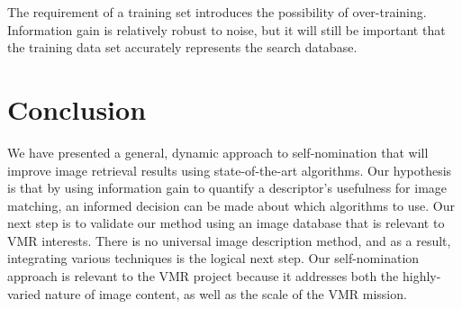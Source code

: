 \documentclass[12pt]{article}
\begin{document}
The requirement of a training set introduces the possibility of over-training. Information gain is relatively robust to noise, but it will still be important that the training data set accurately represents the search database.

\section{Conclusion}
We have presented a general, dynamic approach to self-nomination that will improve image retrieval results using state-of-the-art algorithms. Our hypothesis is that by using information gain to quantify a descriptor's usefulness for image matching, an informed decision can be made about which algorithms to use. Our next step is to validate our method using an image database that is relevant to VMR interests. There is no universal image description method, and as a result, integrating various techniques is the logical next step. Our self-nomination approach is relevant to the VMR project because it addresses both the highly-varied nature of image content, as well as the scale of the VMR mission.



\end{document}
